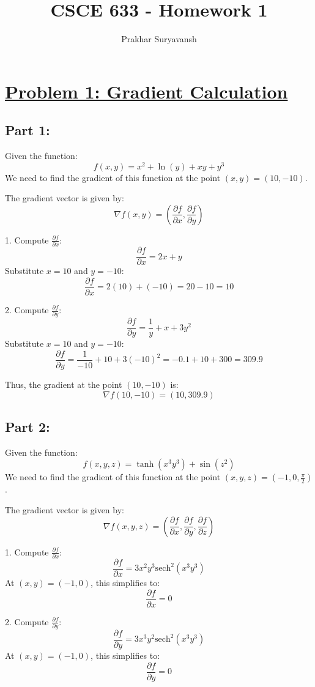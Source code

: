 \documentclass[12pt]{article}
\title{CSCE 633 - Homework 1}
\author{Prakhar Suryavansh}
\date{}
\begin{document}
\maketitle

\section*{\underline{Problem 1: Gradient Calculation}}

\subsection*{Part 1:}
Given the function:
\[
  f(x, y) = x^2 + \ln(y) + xy + y^3
\]
We need to find the gradient of this function at the point \((x, y) = (10, -10)\).

The gradient vector is given by:
\[
  \nabla f(x, y) = \left( \frac{\partial f}{\partial x}, \frac{\partial f}{\partial y} \right)
\]

1. Compute \(\frac{\partial f}{\partial x}\):
\[
  \frac{\partial f}{\partial x} = 2x + y
\]
Substitute \(x = 10\) and \(y = -10\):
\[
  \frac{\partial f}{\partial x} = 2(10) + (-10) = 20 - 10 = 10
\]

2. Compute \(\frac{\partial f}{\partial y}\):
\[
  \frac{\partial f}{\partial y} = \frac{1}{y} + x + 3y^2
\]
Substitute \(x = 10\) and \(y = -10\):
\[
  \frac{\partial f}{\partial y} = \frac{1}{-10} + 10 + 3(-10)^2 = -0.1 + 10 + 300 = 309.9
\]

Thus, the gradient at the point \((10, -10)\) is:
\[
  \nabla f(10, -10) = (10, 309.9)
\]

\subsection*{Part 2:}
Given the function:
\[
  f(x, y, z) = \tanh(x^3y^3) + \sin(z^2)
\]
We need to find the gradient of this function at the point \((x, y, z) = (-1, 0, \frac{\pi}{2})\).

The gradient vector is given by:
\[
  \nabla f(x, y, z) = \left( \frac{\partial f}{\partial x}, \frac{\partial f}{\partial y}, \frac{\partial f}{\partial z} \right)
\]

1. Compute \(\frac{\partial f}{\partial x}\):
\[
  \frac{\partial f}{\partial x} = 3x^2y^3 \text{sech}^2(x^3y^3)
\]
At \((x, y) = (-1, 0)\), this simplifies to:
\[
  \frac{\partial f}{\partial x} = 0
\]

2. Compute \(\frac{\partial f}{\partial y}\):
\[
  \frac{\partial f}{\partial y} = 3x^3y^2 \text{sech}^2(x^3y^3)
\]
At \((x, y) = (-1, 0)\), this simplifies to:
\[
  \frac{\partial f}{\partial y} = 0
\]
\end{document}
